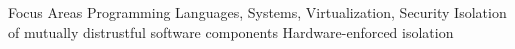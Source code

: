 


\begin{cvskills}

\cvskill
{Focus Areas}
{Programming Languages, Systems, Virtualization, Security\linebreak 
  Isolation of mutually distrustful software components\linebreak
  Hardware-enforced isolation\linebreak
}

\end{cvskills}


